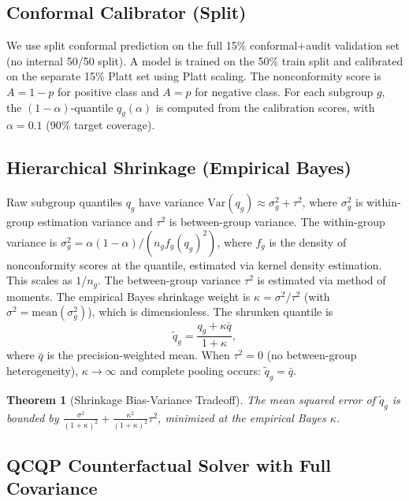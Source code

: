 \documentclass[11pt,a4paper]{article}
\theoremstyle{plain}
\newtheorem{theorem}{Theorem}
\begin{document}
\subsection{Conformal Calibrator (Split)}
\label{sec:conformal}

We use split conformal prediction on the full 15\% conformal+audit validation set (no internal 50/50 split). A model is trained on the 50\% train split and calibrated on the separate 15\% Platt set using Platt scaling. The nonconformity score is $A = 1-p$ for positive class and $A = p$ for negative class. For each subgroup $g$, the $(1-\alpha)$-quantile $q_g(\alpha)$ is computed from the calibration scores, with $\alpha=0.1$ (90\% target coverage).

\subsection{Hierarchical Shrinkage (Empirical Bayes)}
\label{sec:shrinkage}

Raw subgroup quantiles $q_g$ have variance $\text{Var}(q_g) \approx \sigma^2_g + \tau^2$, where $\sigma^2_g$ is within-group estimation variance and $\tau^2$ is between-group variance. The within-group variance is $\sigma^2_g = \alpha(1-\alpha) / (n_g f_g(q_g)^2)$, where $f_g$ is the density of nonconformity scores at the quantile, estimated via kernel density estimation. This scales as $1/n_g$. The between-group variance $\tau^2$ is estimated via method of moments. The empirical Bayes shrinkage weight is $\kappa = \sigma^2 / \tau^2$ (with $\sigma^2 = \text{mean}(\sigma^2_g)$), which is dimensionless. The shrunken quantile is
\begin{equation}
\tilde{q}_g = \frac{q_g + \kappa \bar{q}}{1 + \kappa},
\end{equation}
where $\bar{q}$ is the precision-weighted mean. When $\tau^2=0$ (no between-group heterogeneity), $\kappa \to \infty$ and complete pooling occurs: $\tilde{q}_g = \bar{q}$.

\begin{theorem}[Shrinkage Bias-Variance Tradeoff]
The mean squared error of $\tilde{q}_g$ is bounded by $\frac{\sigma^2}{(1+\kappa)^2} + \frac{\kappa^2}{(1+\kappa)^2}\tau^2$, minimized at the empirical Bayes $\kappa$.
\end{theorem}

\subsection{QCQP Counterfactual Solver with Full Covariance}
\label{sec:counterfactual}
\end{document}
